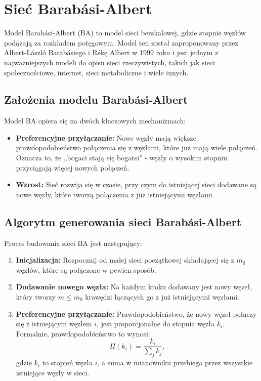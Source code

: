 \section{Sieć Barabási-Albert}
Model Barabási-Albert (BA) to model sieci bezskalowej, gdzie stopnie węzłów podążają za rozkładem potęgowym.
Model ten został zaproponowany przez Albert-László Barabásiego i Rékę Albert w 1999 roku \cite{Barabasi1999} i jest jednym z najważniejszych modeli do opisu sieci rzeczywistych,
takich jak sieci społecznościowe, internet, sieci metaboliczne i wiele innych.

\subsection{Założenia modelu Barabási-Albert}
Model BA opiera się na dwóch kluczowych mechanizmach:

\begin{itemize}
    \item \textbf{Preferencyjne przyłączanie:} Nowe węzły mają większe prawdopodobieństwo połączenia się z węzłami, które już mają wiele połączeń.
          Oznacza to, że „bogaci stają się bogatsi” - węzły o wysokim stopniu przyciągają więcej nowych połączeń.
    \item \textbf{Wzrost:} Sieć rozwija się w czasie, przy czym do istniejącej sieci dodawane są nowe węzły, które tworzą połączenia z już istniejącymi węzłami.
\end{itemize}

\subsection{Algorytm generowania sieci Barabási-Albert}
Proces budowania sieci BA jest następujący:

\begin{enumerate}
    \item \textbf{Inicjalizacja:} Rozpocznij od małej sieci początkowej składającej się z $m_0$ węzłów, które są połączone w pewien sposób.
    \item \textbf{Dodawanie nowego węzła:} Na każdym kroku dodawany jest nowy węzeł, który tworzy $m \leq m_0$ krawędzi łączących go z już istniejącymi węzłami.
    \item \textbf{Preferencyjne przyłączanie:} Prawdopodobieństwo, że nowy węzeł połączy się z istniejącym węzłem $i$, jest proporcjonalne do stopnia węzła $k_i$. Formalnie, prawdopodobieństwo to wynosi:
          \[
              \Pi(k_i) = \frac{k_i}{\sum_{j} k_j},
          \]
          gdzie $k_i$ to stopień węzła $i$, a suma w mianowniku przebiega przez wszystkie istniejące węzły w sieci.
\end{enumerate}

